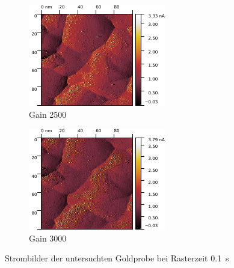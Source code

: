 \begin{figure}[H]
	\begin{subfigure}{0.49\textwidth}
	\centering
	\includegraphics[width=\textwidth]{../Gwyddion/Gold/GAIN_extra_I_forward.pdf}
	\caption{ Gain 2500 }
	\end{subfigure}
	\begin{subfigure}{0.49\textwidth}
	\centering
	\includegraphics[width=\textwidth]{../Gwyddion/Gold/GAIN_fast_I_forward.pdf}
	\caption{ Gain 3000 }
\end{subfigure}

\caption{Strombilder der untersuchten Goldprobe bei Rasterzeit \SI{0.1}{s}}
\label{GAIN_slow_I}
\end{figure}



